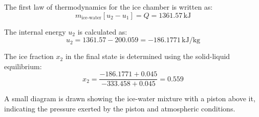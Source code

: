 The first law of thermodynamics for the ice chamber is written as:  
\[
m_{\text{ice-water}} [u_2 - u_1] = Q = 1361.57 \, \text{kJ}
\]  

The internal energy \( u_2 \) is calculated as:  
\[
u_2 = 1361.57 - 200.059 = -186.1771 \, \text{kJ/kg}
\]  

The ice fraction \( x_2 \) in the final state is determined using the solid-liquid equilibrium:  
\[
x_2 = \frac{-186.1771 + 0.045}{-333.458 + 0.045} = 0.559
\]  

A small diagram is drawn showing the ice-water mixture with a piston above it, indicating the pressure exerted by the piston and atmospheric conditions.